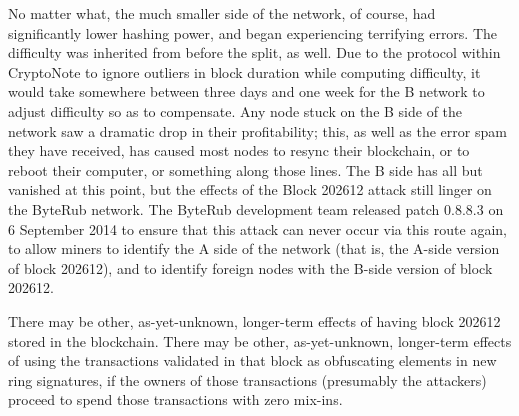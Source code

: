 \documentclass{mrl}
\begin{document}
No matter what, the much smaller side of the network, of course, had significantly lower hashing power, and began experiencing terrifying errors. The difficulty was inherited from before the split, as well. Due to the protocol within CryptoNote to ignore outliers in block duration while computing difficulty, it would take somewhere between three days and one week for the B network to adjust difficulty so as to compensate. Any node stuck on the B side of the network saw a dramatic drop in their profitability; this, as well as the error spam they have received, has caused most nodes to resync their blockchain, or to reboot their computer, or something along those lines. The B side has all but vanished at this point, but the effects of the Block 202612 attack still linger on the ByteRub network. The ByteRub development team released patch 0.8.8.3 on 6 September 2014 to ensure that this attack can never occur via this route again, to allow miners to identify the A side of the network (that is, the A-side version of block 202612), and to identify foreign nodes with the B-side version of block 202612.

There may be other, as-yet-unknown, longer-term effects of having block 202612 stored in the blockchain. There may be other, as-yet-unknown, longer-term effects of using the transactions validated in that block as obfuscating elements in new ring signatures, if the owners of those transactions (presumably the attackers) proceed to spend those transactions with zero mix-ins.

\begin{backmatter}


\end{backmatter}
\end{document}
